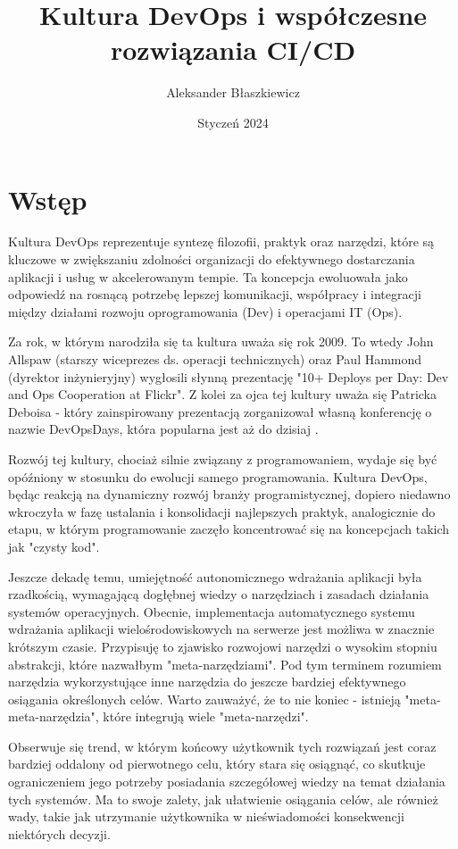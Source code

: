 \documentclass{article}
\title{Kultura DevOps i współczesne rozwiązania CI/CD}
\author{Aleksander Błaszkiewicz}
\date{Styczeń 2024}
\begin{document}
\maketitle
\newpage
\tableofcontents
\newpage

\section{Wstęp}
Kultura DevOps reprezentuje syntezę filozofii, praktyk oraz narzędzi, które są kluczowe w zwiększaniu zdolności organizacji do efektywnego dostarczania aplikacji i usług w akcelerowanym tempie. Ta koncepcja ewoluowała jako odpowiedź na rosnącą potrzebę lepszej komunikacji, współpracy i integracji między działami rozwoju oprogramowania (Dev) i operacjami IT (Ops).

Za rok, w którym narodziła się ta kultura uważa się rok 2009. To wtedy John Allspaw (starszy wiceprezes ds. operacji technicznych) oraz Paul Hammond (dyrektor inżynieryjny) wygłosili słynną prezentację "10+ Deploys per Day: Dev and Ops Cooperation at Flickr"\cite{flickr}. Z kolei za ojca tej kultury uważa się Patricka Deboisa - który zainspirowany prezentacją zorganizował własną konferencję o nazwie DevOpsDays, która popularna jest aż do dzisiaj \cite{devOpsDays}.

Rozwój tej kultury, chociaż silnie związany z programowaniem, wydaje się być opóźniony w stosunku do ewolucji samego programowania. Kultura DevOps, będąc reakcją na dynamiczny rozwój branży programistycznej, dopiero niedawno wkroczyła w fazę ustalania i konsolidacji najlepszych praktyk, analogicznie do etapu, w którym programowanie zaczęło koncentrować się na koncepcjach takich jak "czysty kod".

Jeszcze dekadę temu, umiejętność autonomicznego wdrażania aplikacji była rzadkością, wymagającą dogłębnej wiedzy o narzędziach i zasadach działania systemów operacyjnych. Obecnie, implementacja automatycznego systemu wdrażania aplikacji wielośrodowiskowych na serwerze jest możliwa w znacznie krótszym czasie. Przypisuję to zjawisko rozwojowi narzędzi o wysokim stopniu abstrakcji, które nazwałbym "meta-narzędziami". Pod tym terminem rozumiem narzędzia wykorzystujące inne narzędzia do jeszcze bardziej efektywnego osiągania określonych celów. Warto zauważyć, że to nie koniec - istnieją "meta-meta-narzędzia", które integrują wiele "meta-narzędzi".

Obserwuje się trend, w którym końcowy użytkownik tych rozwiązań jest coraz bardziej oddalony od pierwotnego celu, który stara się osiągnąć, co skutkuje ograniczeniem jego potrzeby posiadania szczegółowej wiedzy na temat działania tych systemów. Ma to swoje zalety, jak ułatwienie osiągania celów, ale również wady, takie jak utrzymanie użytkownika w nieświadomości konsekwencji niektórych decyzji.
\end{document}
